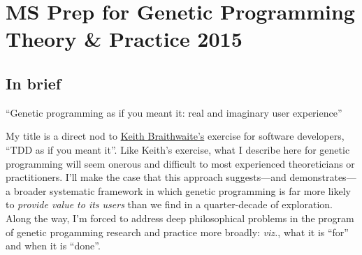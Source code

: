 \section{MS Prep for Genetic Programming Theory \& Practice 2015}\hypertarget{ms-prep-for-genetic-programming-theory--practice-2015}{}\label{ms-prep-for-genetic-programming-theory--practice-2015}

\subsection{In brief}\hypertarget{in-brief}{}\label{in-brief}

``Genetic programming as if you meant it: real and imaginary user experience''

My title is a direct nod to \href{http://cumulative-hypotheses.org/2011/08/30/tdd-as-if-you-meant-it/}{Keith Braithwaite's} exercise for software developers, ``TDD as if you meant it''. Like Keith's exercise, what I describe here for genetic programming will seem onerous and difficult to most experienced theoreticians or practitioners. I'll make the case that this approach suggests---and demonstrates---a broader systematic framework in which genetic programming is far more likely to \emph{provide value to its users} than we find in a quarter-decade of exploration. Along the way, I'm forced to address deep philosophical problems in the program of genetic progamming research and practice more broadly: \emph{viz.}, what it is ``for'' and when it is ``done''.


